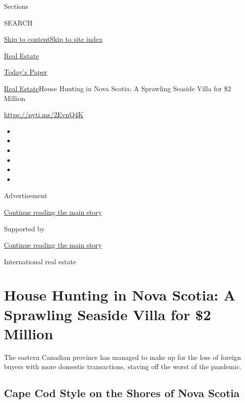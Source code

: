Sections

SEARCH

\protect\hyperlink{site-content}{Skip to
content}\protect\hyperlink{site-index}{Skip to site index}

\href{https://www.nytimes.com/section/realestate}{Real Estate}

\href{https://myaccount.nytimes.com/auth/login?response_type=cookie\&client_id=vi}{}

\href{https://www.nytimes.com/section/todayspaper}{Today's Paper}

\href{/section/realestate}{Real Estate}\textbar{}House Hunting in Nova
Scotia: A Sprawling Seaside Villa for \$2 Million

\url{https://nyti.ms/2EvnQ4K}

\begin{itemize}
\item
\item
\item
\item
\item
\item
\end{itemize}

Advertisement

\protect\hyperlink{after-top}{Continue reading the main story}

Supported by

\protect\hyperlink{after-sponsor}{Continue reading the main story}

International real estate

\hypertarget{house-hunting-in-nova-scotia-a-sprawling-seaside-villa-for-2-million}{%
\section{House Hunting in Nova Scotia: A Sprawling Seaside Villa for \$2
Million}\label{house-hunting-in-nova-scotia-a-sprawling-seaside-villa-for-2-million}}

The eastern Canadian province has managed to make up for the loss of
foreign buyers with more domestic transactions, staving off the worst of
the pandemic.

\href{https://www.nytimes.com/slideshow/2020/07/29/realestate/cape-cod-style-on-the-shores-of-nova-scotia.html}{}

\hypertarget{cape-cod-style-on-the-shores-of-nova-scotia}{%
\subsection{Cape Cod Style on the Shores of Nova
Scotia}\label{cape-cod-style-on-the-shores-of-nova-scotia}}

